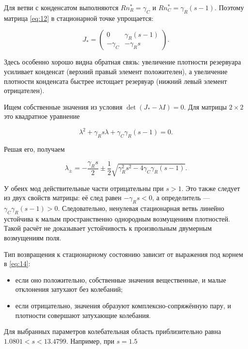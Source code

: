 \documentclass[12pt,a4paper]{article}
\begin{document}
Для ветви с конденсатом выполняются $R n_{R}^{*}=\gamma_{C}$ и $R n_{C}^{*}=\gamma_{R}(s-1)$. Поэтому матрица \eqref{eq:12} в стационарной точке упрощается:

\[
J_*=\begin{pmatrix}0&\gamma_R(s-1)\\-\gamma_C&-\gamma_Rs\end{pmatrix}.
\]

Здесь особенно хорошо видна обратная связь: увеличение плотности резервуара усиливает конденсат (верхний правый элемент положителен), а увеличение плотности конденсата быстрее истощает резервуар (нижний левый элемент отрицателен).

Ищем собственные значения из условия $\det(J_{*}-\lambda I)=0$. Для матрицы $2 \times 2$ это квадратное уравнение

\[
\lambda^2+\gamma_Rs\lambda+\gamma_C\gamma_R(s-1)=0.
\]

Решая его, получаем

\begin{equation}\label{eq:14}
\lambda_\pm=-\frac{\gamma_Rs}{2}\pm\frac12\sqrt{\gamma_R^2s^2-4\gamma_C\gamma_R(s-1)}.\end{equation}

У обеих мод действительные части отрицательны при $s>1$. Это также следует из двух свойств матрицы: её след равен $-\gamma_{R} s<0$, а определитель --- $\gamma_{C} \gamma_{R}(s-1)>0$. Следовательно, ненулевая стационарная ветвь линейно устойчива к малым пространственно однородным возмущениям плотностей. Такой расчёт не доказывает устойчивость к произвольным двумерным возмущениям поля.

Тип возвращения к стационарному состоянию зависит от выражения под корнем в \eqref{eq:14}:

\begin{itemize}\raggedright\setlength{\itemsep}{3pt}\setlength{\parsep}{0pt}

\item если оно положительно, собственные значения вещественные, и малые отклонения затухают без колебаний;

\item если отрицательно, значения образуют комплексно-сопряжённую пару, и плотности совершают затухающие колебания.

\end{itemize}

Для выбранных параметров колебательная область приблизительно равна $1.0801<s<13.4799$. Например, при $s=1.5$
\end{document}
